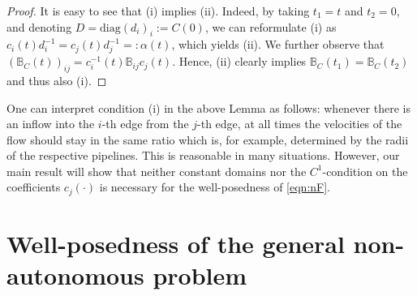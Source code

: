 \documentclass[a4paper,oneside,10pt]{amsart}
\theoremstyle{definition}
\numberwithin{equation}{section}
\def\BB{\mathbb{B}}
\def\diag{\mathrm{diag}}
\begin{document}
\begin{proof}
It is easy to see that (i) implies (ii). Indeed, by taking $t_1=t$ and $t_2=0$, and denoting $D=\diag(d_i)_i:=C(0)$, we can reformulate (i) as $c_i(t) d_i^{-1}=c_j(t) d_j^{-1}=:\alpha (t)$, which yields  (ii).
We further observe that $\left(\BB_C(t)\right)_{ij} = c_i^{-1}(t) \BB_{ij} c_j(t)$. Hence, (ii)  clearly implies $\BB_C(t_1) = \BB_C(t_2)$ and thus also (i). 
\end{proof}

One can interpret condition (i) in the above Lemma as follows: whenever there is an inflow into the $i$-th edge from the $j$-th edge, at all times the velocities of the flow should stay in the same ratio which is, for example,  determined by the radii of the respective pipelines. This is reasonable in many situations. However, our main result will show that neither constant domains nor the  $C^1$-condition on the coefficients $c_j(\cdot)$ is necessary for the well-posedness of  \eqref{eqn:nF}.


\section{Well-posedness of  the general non-autonomous problem}\label{nonaut}
\end{document}
